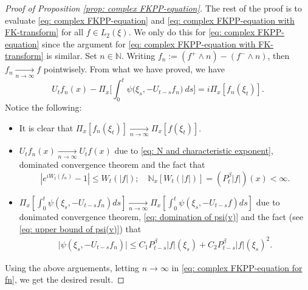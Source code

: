 \documentclass[12pt]{amsart}
\theoremstyle{plain}
\theoremstyle{definition}
\numberwithin{equation}{section}
\begin{document}
\begin{proof}[Proof of Proposition \ref{prop: complex FKPP-equation}]
    The rest of the proof is to evaluate \eqref{eq: complex FKPP-equation} and \eqref{eq: complex FKPP-equation with FK-transform} for all $f\in L_2(\xi)$. We only do this for \eqref{eq: complex FKPP-equation} since the argument for \eqref{eq: complex FKPP-equation with FK-transform} is similar.
    Set $n \in \mathbb N$.
    Writing $f_n := (f^+ \wedge n) - (f^- \wedge n)$, then $f_n \xrightarrow[n\to \infty]{} f$ pointwisely.
    From what we have proved, we have
\begin{equation}
\label{eq: complex FKPP-equation for fn}
    U_tf_n(x) - \Pi_{x} \Big[\int_0^t \psi\big(\xi_s, - U_{t-s}f_n\big) ~ds\Big]
    = i \Pi_{x} [f_n(\xi_t)].
\end{equation}
    Notice the following:
\begin{itemize}
\item
    It is clear that $\Pi_{x}[f_n(\xi_t)] \xrightarrow[n\to \infty]{} \Pi_{x}[f(\xi_t)]$.
\item
     $U_tf_n(x) \xrightarrow[n\to \infty]{} U_tf(x)$ due to \eqref{eq: N and characteristic exponent}, dominated convergence theorem and the fact that
\[
    |e^{i W_t(f_n)} - 1| \leq W_t(|f|);
    \quad \mathbb N_x[W_t(|f|)] = (P_t^\beta |f|)(x) < \infty.
\]
\item
     $\Pi_{x} [\int_0^t \psi(\xi_s,- U_{t-s}f_n)ds] \xrightarrow[n\to \infty]{} \Pi_{x} [\int_0^t \psi(\xi_s,- U_{t-s}f)ds]$ due to donimated convergence theorem, \eqref{eq: domination of psi(v)} and the fact (see \eqref{eq: upper bound of psi(v)}) that
\begin{align}
    \big|\psi(\xi_s,- U_{t-s}f_n)\big|
    \leq C_1 P_{t-s}^\beta|f|(\xi_s)+C_2 P_{t-s}^\beta|f|(\xi_s)^2.
\end{align}
\end{itemize}
    Using the above arguements, letting $n \to \infty$ in \eqref{eq: complex FKPP-equation for fn}, we get the desired result.
\end{proof}
\end{document}

